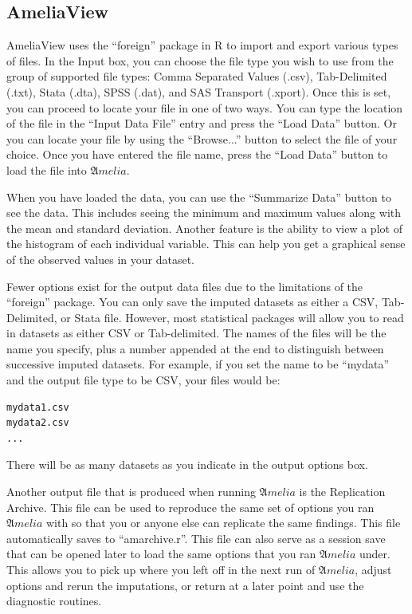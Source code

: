 \documentclass[12pt,titlepage]{article}
\begin{document}
\subsection{AmeliaView}
\label{sec:data-gui}
AmeliaView uses the ``foreign'' package in R to import and export
various types of files.  In the Input box, you can choose the file
type you wish to use from the group of supported file types: Comma
Separated Values (.csv), Tab-Delimited (.txt), Stata (.dta), SPSS
(.dat), and SAS Transport (.xport). Once this is set, you can proceed
to locate your file in one of two ways.  You can type the location of
the file in the ``Input Data File'' entry and press the ``Load Data''
button.  Or you can locate your file by using the ``Browse...'' button
to select the file of your choice.  Once you have entered the file
name, press the ``Load Data'' button to load the file into ${\mathfrak
  Amelia}$.

When you have loaded the data, you can use the ``Summarize Data''
button to see the data.  This includes seeing the minimum and maximum
values along with the mean and standard deviation.  Another feature is
the ability to view a plot of the histogram of each individual
variable.  This can help you get a graphical sense of the observed
values in your dataset.

Fewer options exist for the output data files due to the limitations
of the ``foreign'' package.  You can only save the imputed datasets as
either a CSV, Tab-Delimited, or Stata file. However, most statistical
packages will allow you to read in datasets as either CSV or
Tab-delimited.  The names of the files will be the name you specify,
plus a number appended at the end to distinguish between successive
imputed datasets.  For example, if you set the name to be ``mydata''
and the output file type to be CSV, your files would be:
\begin{verbatim}
mydata1.csv
mydata2.csv
...
\end{verbatim}
There will be as many datasets as you indicate in the output options
box.

Another output file that is produced when running ${\mathfrak Amelia}$
is the Replication Archive.  This file can be used to reproduce the
same set of options you ran ${\mathfrak Amelia}$ with so that you or
anyone else can replicate the same findings.  This file automatically
saves to ``amarchive.r''. This file can also serve as a session save
that can be opened later to load the same options that you ran
${\mathfrak Amelia}$ under.  This allows you to pick up where you left
off in the next run of ${\mathfrak Amelia}$, adjust options and rerun
the imputations, or return at a later point and use the diagnostic
routines.
\end{document}
